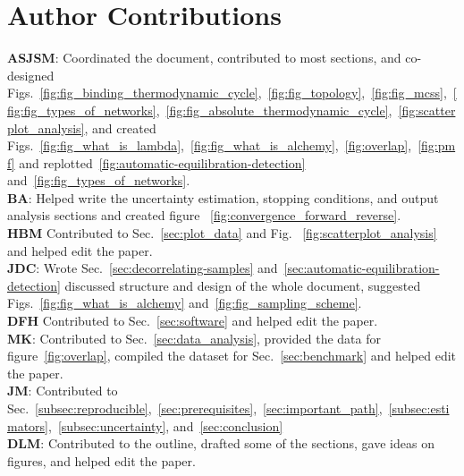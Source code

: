 \documentclass[9pt,bestpractices]{livecoms}
\begin{document}
\section*{Author Contributions}
%
\textbf{ASJSM}: Coordinated the document, contributed to most sections, and co-designed Figs.~\ref{fig:fig_binding_thermodynamic_cycle},~\ref{fig:fig_topology},~\ref{fig:fig_mcss},~\ref{fig:fig_types_of_networks},~\ref{fig:fig_absolute_thermodynamic_cycle},~\ref{fig:scatterplot_analysis}, and created Figs.~\ref{fig:fig_what_is_lambda},~\ref{fig:fig_what_is_alchemy},~\ref{fig:overlap},~\ref{fig:pmf} and replotted~\ref{fig:automatic-equilibration-detection} and~\ref{fig:fig_types_of_networks}.\\
\textbf{BA}: Helped write the uncertainty estimation, stopping conditions, and output analysis sections and created figure ~\ref{fig:convergence_forward_reverse}.\\
\textbf{HBM} Contributed to Sec.~\ref{sec:plot_data} and Fig.~ \ref{fig:scatterplot_analysis} and helped edit the paper.\\
\textbf{JDC}: Wrote Sec.~\ref{sec:decorrelating-samples} and~\ref{sec:automatic-equilibration-detection} discussed structure and design of the whole document, suggested Figs.~\ref{fig:fig_what_is_alchemy} and~\ref{fig:fig_sampling_scheme}. \\
\textbf{DFH} Contributed to Sec.~\ref{sec:software} and helped edit the paper. \\
\textbf{MK}: Contributed to Sec.~\ref{sec:data_analysis}, provided the data for figure~\ref{fig:overlap}, compiled the dataset for Sec.~\ref{sec:benchmark} and helped edit the paper.\\
\textbf{JM}: Contributed to Sec.~\ref{subsec:reproducible},~\ref{sec:prerequisites},~\ref{sec:important_path},~\ref{subsec:estimators},~\ref{subsec:uncertainty}, and~\ref{sec:conclusion}\\
\textbf{DLM}: Contributed to the outline, drafted some of the sections, gave ideas on figures, and helped edit the paper.\\
\end{document}
